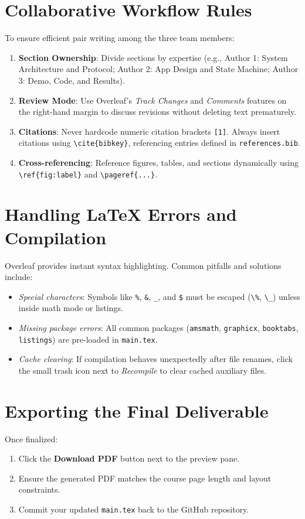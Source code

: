 \documentclass[conference]{IEEEtran}
\begin{document}
\section{Collaborative Workflow Rules}
To ensure efficient pair writing among the three team members:
\begin{enumerate}
    \item \textbf{Section Ownership}: Divide sections by expertise (e.g., Author 1: System Architecture and Protocol; Author 2: App Design and State Machine; Author 3: Demo, Code, and Results).
    \item \textbf{Review Mode}: Use Overleaf's \textit{Track Changes} and \textit{Comments} features on the right-hand margin to discuss revisions without deleting text prematurely.
    \item \textbf{Citations}: Never hardcode numeric citation brackets \texttt{[1]}. Always insert citations using \texttt{\textbackslash cite\{bibkey\}}, referencing entries defined in \texttt{references.bib}.
    \item \textbf{Cross-referencing}: Reference figures, tables, and sections dynamically using \texttt{\textbackslash ref\{fig:label\}} and \texttt{\textbackslash pageref\{...\}}.
\end{enumerate}

\section{Handling LaTeX Errors and Compilation}
Overleaf provides instant syntax highlighting. Common pitfalls and solutions include:
\begin{itemize}
    \item \textit{Special characters}: Symbols like \texttt{\%}, \texttt{\&}, \texttt{\_}, and \texttt{\$} must be escaped (\texttt{\textbackslash\%}, \texttt{\textbackslash\_}) unless inside math mode or listings.
    \item \textit{Missing package errors}: All common packages (\texttt{amsmath}, \texttt{graphicx}, \texttt{booktabs}, \texttt{listings}) are pre-loaded in \texttt{main.tex}.
    \item \textit{Cache clearing}: If compilation behaves unexpectedly after file renames, click the small trash icon next to \textit{Recompile} to clear cached auxiliary files.
\end{itemize}

\section{Exporting the Final Deliverable}
Once finalized:
\begin{enumerate}
    \item Click the \textbf{Download PDF} button next to the preview pane.
    \item Ensure the generated PDF matches the course page length and layout constraints.
    \item Commit your updated \texttt{main.tex} back to the GitHub repository.
\end{enumerate}
\end{document}
